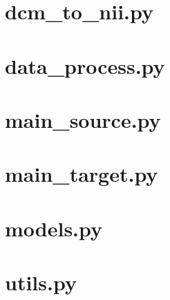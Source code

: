 \documentclass[11pt,times,oneside,openright]{eeereport}
\begin{document}
\begin{appendices}
\section{dcm\_to\_nii.py}

\clearpage
\section{data\_process.py}

\clearpage
\section{main\_source.py}

\clearpage
\section{main\_target.py}

\clearpage
\section{models.py}

\clearpage
\section{utils.py}

\end{appendices}
\end{document}
